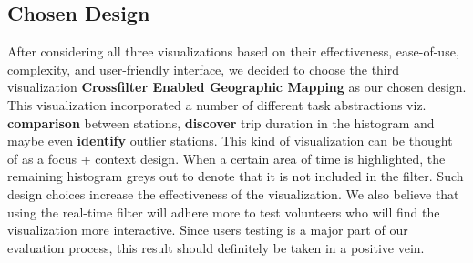 \subsection{Chosen Design}
\label{sec:viz4}

After considering all three visualizations based on their effectiveness, ease-of-use, complexity, and user-friendly interface, we decided to choose the third visualization \textbf{Crossfilter Enabled Geographic Mapping} as our chosen design. This visualization incorporated a number of different task abstractions viz. \textbf{comparison} between stations, \textbf{discover} trip duration in the histogram and maybe even \textbf{identify} outlier stations. This kind of visualization can be thought of as a focus + context design. When a certain area of time is highlighted, the remaining histogram greys out to denote that it is not included in the filter. Such design choices increase the effectiveness of the visualization. We also believe that using the real-time filter will adhere more to test volunteers who will find the visualization more interactive. Since users testing is a major part of our evaluation process, this result should definitely be taken in a positive vein.